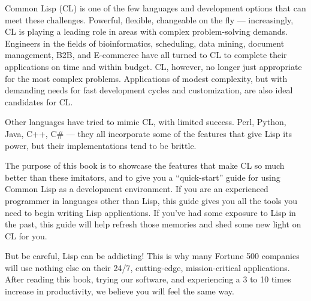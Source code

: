 \documentclass[11pt]{book}
\begin{document}
Common Lisp (CL) is one of the few languages and development options that can meet
these challenges. Powerful, flexible, changeable on the fly --- increasingly, CL is playing
a leading role in areas with complex problem-solving demands. Engineers in the fields of
bioinformatics, scheduling, data mining, document management, B2B, and E-commerce
have all turned to CL to complete their applications on time and within budget. CL,
however, no longer just appropriate for the most complex problems. Applications of modest
complexity, but with demanding needs for fast development cycles and customization, are
also ideal candidates for CL.

Other languages have tried to mimic CL, with limited success. Perl, Python, Java,
C++, C\# --- they all incorporate some of the features that give Lisp its power, but their
implementations tend to be brittle.

The purpose of this book is to showcase the features that make CL so much better
than these imitators, and to give you a ``quick-start'' guide for using Common Lisp as a
development environment. If you are an experienced programmer in languages other than
Lisp, this guide gives you all the tools you need to begin writing Lisp applications. If you've
had some exposure to Lisp in the past, this guide will help refresh those memories and shed
some new light on CL for you.

But be careful, Lisp can be addicting! This is why many Fortune 500 companies will
use nothing else on their 24/7, cutting-edge, mission-critical applications. After reading
this book, trying our software, and experiencing a 3 to 10 times increase in productivity,
we believe you will feel the same way.

\tableofcontents

\mainmatter











\backmatter

\printindex
\end{document}
